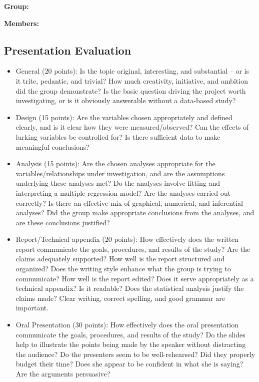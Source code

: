 \documentclass[11pt]{article}
\begin{document}

\noindent
{\bf Group:}

\vspace{.2in}

\noindent
{\bf Members:} 


\subsection*{Presentation Evaluation}

	\begin{itemize}
\itemsep2in
		\item General (20 points): Is the topic original, interesting, and substantial -- or is it trite, pedantic, and trivial?  How much creativity, initiative, and ambition did the group demonstrate?  Is the basic question driving the project worth investigating, or is it obviously answerable without a data-based study?
		\item Design (15 points):  Are the variables chosen appropriately and defined clearly, and is it clear how they were measured/observed?  Can the effects of lurking variables be controlled for?  Is there sufficient data to make meaningful conclusions? 
		\item Analysis (15 points):  Are the chosen analyses appropriate for the variables/relationships under investigation, and are the assumptions underlying these analyses met?  Do the analyses involve fitting and interpreting a multiple regression model?  Are the analyses carried out correctly?  Is there an effective mix of graphical, numerical, and inferential analyses?  Did the group make appropriate conclusions from the analyses, and are these conclusions justified?
		\item Report/Technical appendix (20 points):  How effectively does the written report communicate the goals, procedures, and results of the study?  Are the claims adequately supported? How well is the report structured and organized? Does the writing style enhance what the group is trying to communicate?  How well is the report edited? Does it serve appropriately as a technical appendix? Is it readable? Does the statistical analysis justify the claims made? Clear writing, correct spelling, and good grammar are important.
		\item Oral Presentation (30 points): How effectively does the oral presentation communicate the goals, procedures, and results of the study? Do the slides help to illustrate the points being made by the speaker without distracting the audience? Do the presenters seem to be well-rehearsed? Did they properly budget their time? Does she appear to be confident in what she is saying? Are the arguments persuasive? 
	\end{itemize}
\end{document}
